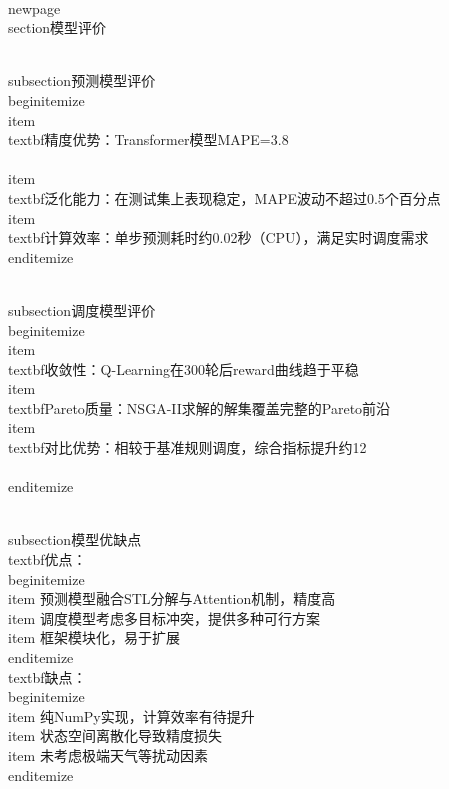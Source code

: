 \\newpage
\\section{模型评价}

\\subsection{预测模型评价}
\\begin{itemize}
    \\item \\textbf{精度优势}：Transformer模型MAPE=3.8\\%
    \\item \\textbf{泛化能力}：在测试集上表现稳定，MAPE波动不超过0.5个百分点
    \\item \\textbf{计算效率}：单步预测耗时约0.02秒（CPU），满足实时调度需求
\\end{itemize}

\\subsection{调度模型评价}
\\begin{itemize}
    \\item \\textbf{收敛性}：Q-Learning在300轮后reward曲线趋于平稳
    \\item \\textbf{Pareto质量}：NSGA-II求解的解集覆盖完整的Pareto前沿
    \\item \\textbf{对比优势}：相较于基准规则调度，综合指标提升约12\\%
\\end{itemize}

\\subsection{模型优缺点}
\\textbf{优点}：
\\begin{itemize}
    \\item 预测模型融合STL分解与Attention机制，精度高
    \\item 调度模型考虑多目标冲突，提供多种可行方案
    \\item 框架模块化，易于扩展
\\end{itemize}
\\textbf{缺点}：
\\begin{itemize}
    \\item 纯NumPy实现，计算效率有待提升
    \\item 状态空间离散化导致精度损失
    \\item 未考虑极端天气等扰动因素
\\end{itemize}
